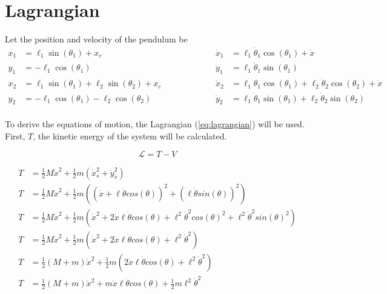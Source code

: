 \documentclass[10pt]{article}
\begin{document}
    \section{Lagrangian}
    Let the position and velocity of the pendulum be
    \begin{equation*}
    \begin{aligned}
        x_1 &= \ell_1 \sin(\theta_1) + x_c                                    & & \qquad \qquad & \dot x_1 &= \ell_1 \dot \theta_1 \cos(\theta_1) + \dot x \\
        y_1 &= -\ell_1 \cos(\theta_1)                                         & &  \quad \qquad & \dot y_1 &= \ell_1 \dot \theta_1 \sin(\theta_1)  \\
        x_2 &= \ell_1 \sin(\theta_1) + \ell_2 \sin(\theta_2) + x_c            & & \qquad \qquad & \dot x_2 &= \ell_1 \theta_1 \cos(\theta_1) + \ell_2 \dot \theta_2 \cos(\theta_2) + \dot x \\
        y_2 &= -\ell_1 \cos(\theta_1) - \ell_2 \cos(\theta_2)                 & &  \quad \qquad & \dot y_2 &= \ell_1 \dot \theta_1 \sin(\theta_1) + \ell_2 \dot \theta_2 \sin(\theta_2)  \\
    \end{aligned}
    \end{equation*}
    

    To derive the equations of motion, the Lagrangian (\ref{eq:lagrangian}) will be used.
    First, $T$, the kinetic energy of the system will be calculated.

    \begin{equation} \label{eq:lagrangian}
        \mathcal{L} = T - V
    \end{equation}

    \begin{equation}
        \begin{aligned} \label{eq:kinetic}
            T &= \frac{1}{2}  M  \dot x^2 + \frac{1}{2}  m (\dot x_s^2 + \dot y_s^2) \\
            T &= \frac{1}{2}  M  \dot x^2 + \frac{1}{2} m((\dot x + \ell  \dot \theta  cos(\theta))^2 + (\ell  \dot \theta  sin(\theta))^2) \\
            T &= \frac{1}{2}  M  \dot x^2 + \frac{1}{2}  m(\dot x^2 + 2 \dot x  \ell  \dot \theta  cos(\theta) + \ell^2  \dot \theta^2 cos(\theta)^2 + \ell^2  \dot \theta^2  sin(\theta)^2) \\
            T &= \frac{1}{2}  M  \dot x^2 + \frac{1}{2} m(\dot x^2 + 2 \dot x \ell \dot \theta cos(\theta) + \ell^2 \dot \theta^2) \\
            T &= \frac{1}{2}(M + m) \dot x^2 + \frac{1}{2}m(2 \dot x \ell \dot \theta cos(\theta) + \ell^2 \dot \theta^2) \\
            T &= \frac{1}{2}(M + m) \dot x^2 + m \dot x \ell \dot \theta cos(\theta) + \frac{1}{2}m \ell^2 \dot \theta^2 
        \end{aligned}
    \end{equation}
\end{document}
